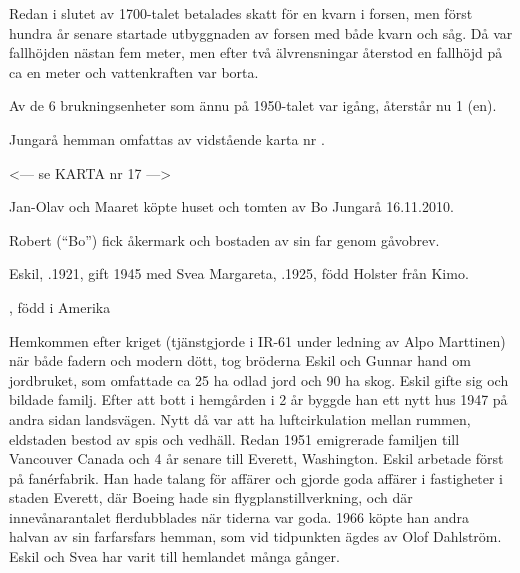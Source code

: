 Redan i slutet av 1700-talet betalades skatt för en kvarn i forsen, men först hundra år senare startade utbyggnaden av forsen med både kvarn och såg. Då var fallhöjden nästan fem meter, men efter två älvrensningar återstod en fallhöjd på ca en meter och vattenkraften var borta.

Av de 6 brukningsenheter som ännu på 1950-talet var igång, återstår nu 1 (en).


Jungarå hemman omfattas av vidstående karta nr .


<--- se KARTA nr 17 --->








Jan-Olav och Maaret köpte huset och tomten av Bo Jungarå 16.11.2010.\jhvspace{}


Robert (``Bo'') fick åkermark och bostaden av sin far genom gåvobrev.\jhvspace{}


Eskil, .1921, gift 1945 med Svea Margareta, .1925, född Holster från Kimo.
\begin{jhchildren}
  \item {}
  \item {}, född i Amerika
\end{jhchildren}

Hemkommen efter kriget (tjänstgjorde i IR-61 under ledning av Alpo 	Marttinen) när både fadern och modern dött, tog bröderna Eskil och Gunnar hand om jordbruket, som omfattade ca 25 ha odlad jord och 90 ha skog. Eskil gifte sig och bildade familj. Efter att bott i hemgården i 2 år byggde han ett nytt hus 1947 på andra sidan landsvägen. Nytt då var att ha luftcirkulation mellan rummen, eldstaden bestod av spis och vedhäll. Redan 1951 emigrerade familjen till Vancouver 	Canada och 4 år senare till Everett, Washington. Eskil arbetade först på fanérfabrik. Han hade talang för affärer och gjorde goda affärer i fastigheter i staden Everett, där Boeing hade sin flygplanstillverkning, och där innevånarantalet flerdubblades när tiderna var goda. 1966 köpte han andra halvan av sin farfarsfars hemman, som vid tidpunkten ägdes av Olof Dahlström. Eskil och Svea har varit till hemlandet många gånger.

